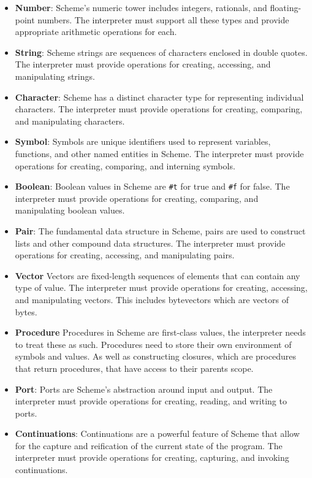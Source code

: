 \documentclass[final]{cmpreport_02}
\begin{document}
\begin{itemize}[noitemsep]
    \item \textbf{Number}: Scheme's numeric tower includes integers, rationals, and floating-point numbers. The interpreter must support all these types and provide appropriate arithmetic operations for each.
    \item \textbf{String}: Scheme strings are sequences of characters enclosed in double quotes. The interpreter must provide operations for creating, accessing, and manipulating strings.
    \item \textbf{Character}: Scheme has a distinct character type for representing individual characters. The interpreter must provide operations for creating, comparing, and manipulating characters.
    \item \textbf{Symbol}: Symbols are unique identifiers used to represent variables, functions, and other named entities in Scheme. The interpreter must provide operations for creating, comparing, and interning symbols.
    \item \textbf{Boolean}: Boolean values in Scheme are \texttt{\#t} for true and \texttt{\#f} for false. The interpreter must provide operations for creating, comparing, and manipulating boolean values.
    \item \textbf{Pair}: The fundamental data structure in Scheme, pairs are used to construct lists and other compound data structures. The interpreter must provide operations for creating, accessing, and manipulating pairs.
    \item \textbf{Vector} Vectors are fixed-length sequences of elements that can contain any type of value. The interpreter must provide operations for creating, accessing, and manipulating vectors. This includes bytevectors which are vectors of bytes.
    \item \textbf{Procedure} Procedures in Scheme are first-class values, the interpreter needs to treat these as such. Procedures need to store their own environment of symbols and values. As well as constructing closures, which are procedures that return procedures, that have access to their parents scope.
    \item \textbf{Port}: Ports are Scheme's abstraction around input and output. The interpreter must provide operations for creating, reading, and writing to ports.
    \item \textbf{Continuations}: Continuations are a powerful feature of Scheme that allow for the capture and reification of the current state of the program. The interpreter must provide operations for creating, capturing, and invoking continuations.
\end{itemize}
\end{document}
